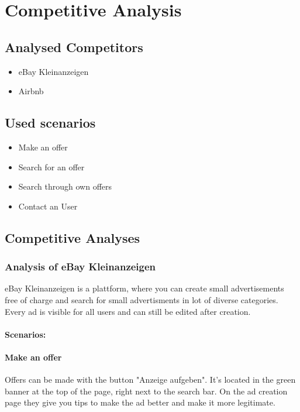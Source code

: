 \section{Competitive Analysis}\label{Competitive Analysis}

\subsection{Analysed Competitors}

\begin{itemize}
	\item eBay Kleinanzeigen
	\item Airbnb
\end{itemize}

\subsection{Used scenarios}

\begin{itemize}
	\item Make an offer
	\item Search for an offer
	\item Search through own offers
	\item Contact an User
\end{itemize}

\subsection{Competitive Analyses}

	\subsubsection{Analysis of eBay Kleinanzeigen}
		eBay Kleinanzeigen is a plattform, where you can create small advertisements free of charge and search for small advertisments in lot of diverse categories. Every ad is visible for all users and can still be edited after creation.
		
		\paragraph{Scenarios:}
		
		\paragraph{Make an offer} 
		Offers can be made with the button "Anzeige aufgeben". It's located in the green banner at the top of the page, right next to the search bar. On the ad creation page they give you tips to make the ad better and make it more legitimate.
		
